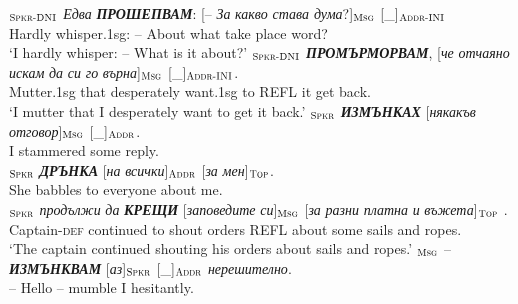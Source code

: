 \documentclass[output=paper,colorlinks,citecolor=brown]{langscibook}
\begin{document}
\begin{exe}
\ex \label{ex:03mannerbg}
\begin{xlist}
\ex  \label{ex:03mannerbg:a}
\gll {[\_]}$_{\text{\textsc{Spkr-DNI}}}$ \textit{Едва} \textit{\textbf{ПРОШЕПВАМ}}: [– \textit{За} \textit{какво} \textit{става дума}?]$_{\text{\textsc{Msg}}}$ [\_]$_{\text{\textsc{Addr-INI}}}$ \\
{} Hardly whisper.1sg: – About what {take place word}? {}
\\
\glt `I hardly whisper: – What is it about?'
\ex  \label{ex:03mannerbg:b}
\gll {[\_]}$_{\text{\textsc{Spkr-DNI}}}$ \textit{\textbf{ПРОМЪРМОРВАМ}}, [\textit{че} \textit{отчаяно} \textit{искам} \textit{да} \textit{си} \textit{го} \textit{върна}]$_{\text{\textsc{Msg}}}$ [\_]$_{\text{\textsc{Addr-INI}}}$.\\
{} Mutter.1sg that desperately want.1sg to REFL it {get back}. {}\\
\glt `I mutter that I desperately want to get it back.'
\ex  \label{ex:03mannerbg:c}
\gll {[\textit{Аз}]}$_{\text{\textsc{Spkr}}}$ \textit{\textbf{ИЗМЪНКАХ}} [\textit{някакъв} \textit{отговор}]$_{\text{\textsc{Msg}}}$ [\_]$_{\text{\textsc{Addr}}}$. \\
I stammered some reply. {}
\\
\ex  \label{ex:03mannerbg:d}
\gll {[\textit{Тя}]}$_{\text{\textsc{Spkr}}}$ \textit{\textbf{ДРЪНКА}} [\textit{на} \textit{всички}]$_{\text{\textsc{Addr}}}$ [\textit{за} \textit{мен}]$_{\text{\textsc{Top}}}$.\\
She babbles to everyone about me.
\\
\ex  \label{ex:03mannerbg:e}
$_{\text{\textsc{Spkr}}}$ \textit{продължи} \textit{да} \textit{\textbf{КРЕЩИ}} [\textit{заповедите} \textit{си}]$_{\text{\textsc{Msg}}}$
[\textit{за} \textit{разни} \textit{платна} \textit{и} \textit{въжета}]$_{\text{\textsc{Top}}}$%
. \\
Captain-\textsc{def} continued to shout orders REFL about some sails and ropes.\\
\glt `The captain continued shouting his orders about sails and ropes.'
\ex  \label{ex:03mannerbg:f}
$_{\text{\textsc{Msg}}}$ – \textit{\textbf{ИЗМЪНКВАМ}} [\textit{аз}]$_{\text{\textsc{Spkr}}}$ [\_]$_{\text{\textsc{Addr}}}$  \textit{нерешително}.\\
{– Hello} – mumble I {} hesitantly.
\\ %
\end{xlist}
\end{exe}
\end{document}
